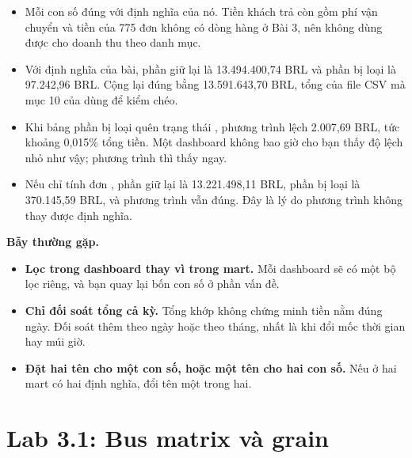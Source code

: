 \begin{itemize}
  \item Mỗi con số đúng với định nghĩa của nó. Tiền khách trả còn gồm phí vận chuyển và tiền của 775 đơn không có dòng hàng ở Bài 3, nên không dùng được cho doanh thu theo danh mục.
  \item Với định nghĩa của bài, phần giữ lại là 13.494.400,74 BRL và phần bị loại là 97.242,96 BRL. Cộng lại đúng bằng 13.591.643,70 BRL, tổng  của file CSV mà mục 10 của  dùng để kiểm chéo.
  \item Khi bảng phần bị loại quên trạng thái , phương trình lệch 2.007,69 BRL, tức khoảng 0,015\% tổng tiền. Một dashboard không bao giờ cho bạn thấy độ lệch nhỏ như vậy; phương trình thì thấy ngay.
  \item Nếu chỉ tính đơn , phần giữ lại là 13.221.498,11 BRL, phần bị loại là 370.145,59 BRL, và phương trình vẫn đúng. Đây là lý do phương trình không thay được định nghĩa.
\end{itemize}

\begin{luuy}
\textbf{Bẫy thường gặp.}
\begin{itemize}
  \item \textbf{Lọc trong dashboard thay vì trong mart.} Mỗi dashboard sẽ có một bộ lọc riêng, và bạn quay lại bốn con số ở phần vấn đề.
  \item \textbf{Chỉ đối soát tổng cả kỳ.} Tổng khớp không chứng minh tiền nằm đúng ngày. Đối soát thêm theo ngày hoặc theo tháng, nhất là khi đổi mốc thời gian hay múi giờ.
  \item \textbf{Đặt hai tên cho một con số, hoặc một tên cho hai con số.} Nếu  ở hai mart có hai định nghĩa, đổi tên một trong hai.
\end{itemize}
\end{luuy}

\section{Lab 3.1: Bus matrix và grain}

